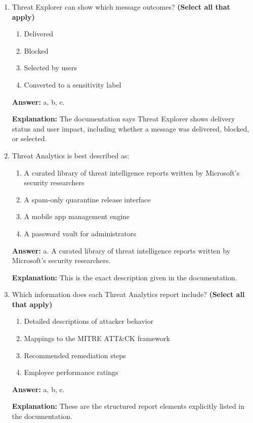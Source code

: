 \documentclass[10pt]{article}
\begin{document}
\begin{enumerate}[leftmargin=*]
\textbf{Explanation:} The documentation uses this exact example to show coordinated investigation and response.

\item Threat Explorer can show which message outcomes? \textbf{(Select all that apply)}
\begin{enumerate}[label=\alph*., leftmargin=1.5em]
\item Delivered
\item Blocked
\item Selected by users
\item Converted to a sensitivity label
\end{enumerate}
\textbf{Answer:} a, b, c.

\textbf{Explanation:} The documentation says Threat Explorer shows delivery status and user impact, including whether a message was delivered, blocked, or selected.

\item Threat Analytics is best described as:
\begin{enumerate}[label=\alph*., leftmargin=1.5em]
\item A curated library of threat intelligence reports written by Microsoft’s security researchers
\item A spam-only quarantine release interface
\item A mobile app management engine
\item A password vault for administrators
\end{enumerate}
\textbf{Answer:} a. A curated library of threat intelligence reports written by Microsoft’s security researchers.

\textbf{Explanation:} This is the exact description given in the documentation.

\item Which information does each Threat Analytics report include? \textbf{(Select all that apply)}
\begin{enumerate}[label=\alph*., leftmargin=1.5em]
\item Detailed descriptions of attacker behavior
\item Mappings to the MITRE ATT\&CK framework
\item Recommended remediation steps
\item Employee performance ratings
\end{enumerate}
\textbf{Answer:} a, b, c.

\textbf{Explanation:} These are the structured report elements explicitly listed in the documentation.


\end{enumerate}
\end{document}
